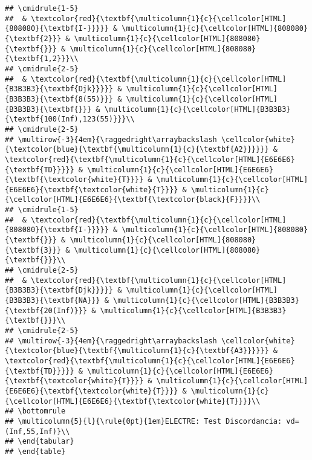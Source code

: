 \documentclass[
]{article}
\begin{document}
\begin{verbatim}
## \cmidrule{1-5}
##  & \textcolor{red}{\textbf{\multicolumn{1}{c}{\cellcolor[HTML]{808080}{\textbf{I-}}}}} & \multicolumn{1}{c}{\cellcolor[HTML]{808080}{\textbf{2}}} & \multicolumn{1}{c}{\cellcolor[HTML]{808080}{\textbf{}}} & \multicolumn{1}{c}{\cellcolor[HTML]{808080}{\textbf{1,2}}}\\
## \cmidrule{2-5}
##  & \textcolor{red}{\textbf{\multicolumn{1}{c}{\cellcolor[HTML]{B3B3B3}{\textbf{Djk}}}}} & \multicolumn{1}{c}{\cellcolor[HTML]{B3B3B3}{\textbf{8(55)}}} & \multicolumn{1}{c}{\cellcolor[HTML]{B3B3B3}{\textbf{}}} & \multicolumn{1}{c}{\cellcolor[HTML]{B3B3B3}{\textbf{100(Inf),123(55)}}}\\
## \cmidrule{2-5}
## \multirow{-3}{4em}{\raggedright\arraybackslash \cellcolor{white}{\textcolor{blue}{\textbf{\multicolumn{1}{c}{\textbf{A2}}}}}} & \textcolor{red}{\textbf{\multicolumn{1}{c}{\cellcolor[HTML]{E6E6E6}{\textbf{TD}}}}} & \multicolumn{1}{c}{\cellcolor[HTML]{E6E6E6}{\textbf{\textcolor{white}{T}}}} & \multicolumn{1}{c}{\cellcolor[HTML]{E6E6E6}{\textbf{\textcolor{white}{T}}}} & \multicolumn{1}{c}{\cellcolor[HTML]{E6E6E6}{\textbf{\textcolor{black}{F}}}}\\
## \cmidrule{1-5}
##  & \textcolor{red}{\textbf{\multicolumn{1}{c}{\cellcolor[HTML]{808080}{\textbf{I-}}}}} & \multicolumn{1}{c}{\cellcolor[HTML]{808080}{\textbf{}}} & \multicolumn{1}{c}{\cellcolor[HTML]{808080}{\textbf{3}}} & \multicolumn{1}{c}{\cellcolor[HTML]{808080}{\textbf{}}}\\
## \cmidrule{2-5}
##  & \textcolor{red}{\textbf{\multicolumn{1}{c}{\cellcolor[HTML]{B3B3B3}{\textbf{Djk}}}}} & \multicolumn{1}{c}{\cellcolor[HTML]{B3B3B3}{\textbf{NA}}} & \multicolumn{1}{c}{\cellcolor[HTML]{B3B3B3}{\textbf{20(Inf)}}} & \multicolumn{1}{c}{\cellcolor[HTML]{B3B3B3}{\textbf{}}}\\
## \cmidrule{2-5}
## \multirow{-3}{4em}{\raggedright\arraybackslash \cellcolor{white}{\textcolor{blue}{\textbf{\multicolumn{1}{c}{\textbf{A3}}}}}} & \textcolor{red}{\textbf{\multicolumn{1}{c}{\cellcolor[HTML]{E6E6E6}{\textbf{TD}}}}} & \multicolumn{1}{c}{\cellcolor[HTML]{E6E6E6}{\textbf{\textcolor{white}{T}}}} & \multicolumn{1}{c}{\cellcolor[HTML]{E6E6E6}{\textbf{\textcolor{white}{T}}}} & \multicolumn{1}{c}{\cellcolor[HTML]{E6E6E6}{\textbf{\textcolor{white}{T}}}}\\
## \bottomrule
## \multicolumn{5}{l}{\rule{0pt}{1em}ELECTRE: Test Discordancia: vd=(Inf,55,Inf)}\\
## \end{tabular}
## \end{table}
\end{verbatim}
\end{document}
